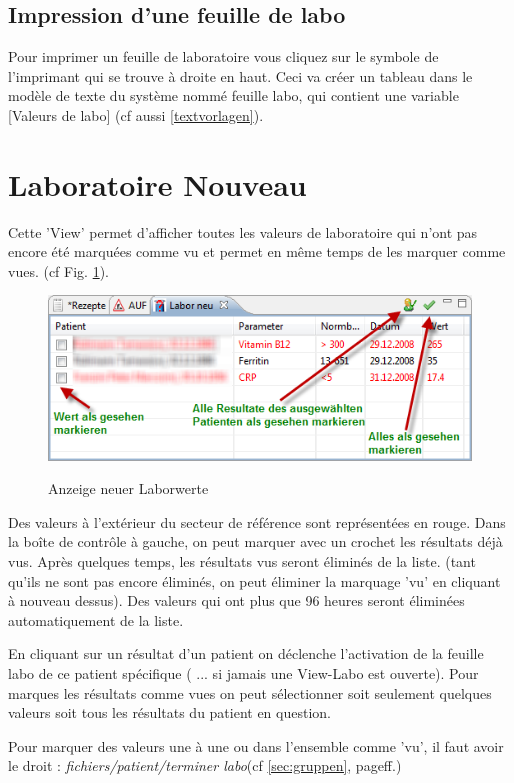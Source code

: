 \subsection{Impression d'une feuille de labo}
Pour imprimer un feuille de laboratoire vous cliquez sur le symbole de l'imprimant qui se trouve à droite en haut. Ceci va créer un tableau dans le modèle de texte du système nommé \glqq feuille labo\grqq{}, qui contient une variable  [Valeurs de labo] (cf aussi \ref{textvorlagen}).

\section{Laboratoire Nouveau}
Cette 'View' permet d'afficher toutes les valeurs de laboratoire qui n'ont pas encore été marquées comme \glqq vu\grqq{} et permet en même temps de les marquer comme vues. (cf Fig. \ref{fig:labneu}).

\begin{figure}
  \includegraphics{images/labneu1}\\
  \caption{Anzeige neuer Laborwerte}\label{fig:labneu}
\end{figure}

Des valeurs à l'extérieur du secteur de référence sont représentées en rouge. Dans la boîte de contrôle à gauche, on peut marquer avec un crochet les résultats déjà vus. Après quelques temps, les résultats vus seront éliminés de la liste. (tant qu'ils ne sont pas encore éliminés, on peut éliminer la marquage 'vu' en cliquant à nouveau dessus). Des valeurs qui ont plus que 96 heures seront éliminées automatiquement de la liste.

En cliquant sur un résultat d'un patient on déclenche l'activation de la feuille labo de ce patient spécifique ( ... si jamais une View-Labo est ouverte). Pour marques les résultats comme vues on peut sélectionner soit seulement quelques valeurs soit tous les résultats du patient en question. 

Pour marquer des valeurs une à une ou dans l'ensemble comme 'vu', il faut avoir le droit : \textit{fichiers/patient/terminer labo}(cf \ref{sec:gruppen}, page\pageref{sec:gruppen}ff.)
